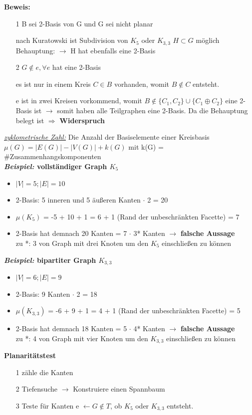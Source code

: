 \textbf{Beweis:}
\begin{itemize}
	\item[1] B sei 2-Basis von G und G sei nicht planar 
	\item[] nach Kuratowski ist Subdivision von $K_5$ oder $K_{3,3}$ $H \subset G$ möglich \newline Behauptung: $\rightarrow$ H hat ebenfalls eine 2-Basis \newline
	
	\item[2] $G \notin e, \forall e$ hat eine 2-Basis
	\item[] es ist nur in einem Kreis $C \in B$ vorhanden, womit $B \notin C$ entsteht.
	\item[] e ist in zwei Kreisen vorkommend, womit $B \notin \{C_1, C_2\} \cup \{ C_1 \oplus C_2\}$ eine 2-Basis ist \newline $\rightarrow$ somit haben alle Teilgraphen eine 2-Basis. Da die Behauptung belegt ist $\Rightarrow$ \textbf{Widerspruch}
\end{itemize}
\textit{\underline{zyklometrische Zahl:}} Die Anzahl der Basiselemente einer Kreisbasis\\
$\mu(G)=|E(G)| - |V(G)| + k(G)$ mit k(G) = \#Zusammenhangskomponenten
\\
\newline
\textbf{\textit{Beispiel:} vollständiger Graph $K_5$}
\begin{itemize}
	\item $|V| = 5 ; |E| = 10$
	\item 2-Basis: 5 inneren und 5 äußeren Kanten $\cdot$ 2 = 20
	\item $\mu(K_5)$ = -5 + 10 + 1 = 6 + 1 (Rand der unbeschränkten Facette) = 7
	\item 2-Basis hat demnach 20 Kanten = 7 $\cdot$ 3* Kanten $\rightarrow$ \textbf{falsche Aussage}\\
	zu *: 3 von Graph mit drei Knoten um den $K_5$ einschließen zu können
\end{itemize}	
\textbf{\textit{Beispiel:} bipartiter Graph $K_{3,3}$}
\begin{itemize}
	\item $|V| = 6 ; |E| = 9$
	\item 2-Basis: 9 Kanten $\cdot$ 2 = 18
	\item $\mu(K_{3,3})$ = -6 + 9 + 1 = 4 + 1 (Rand der unbeschränkten Facette) = 5
	\item 2-Basis hat demnach 18 Kanten = 5 $\cdot$ 4* Kanten $\rightarrow$ \textbf{falsche Aussage}\\
	zu *: 4 von Graph mit vier Knoten um den $K_{3,3}$ einschließen zu können
\end{itemize}
\textbf{Planaritätstest}
\begin{itemize}
	\item[1] zähle die Kanten 
	\item[2] Tiefensuche $\rightarrow$ Konstruiere einen Spannbaum
	\item[3] Teste für Kanten e $\leftarrow G \notin T$, ob $K_5$ oder $K_{3,3}$ entsteht.
\end{itemize}